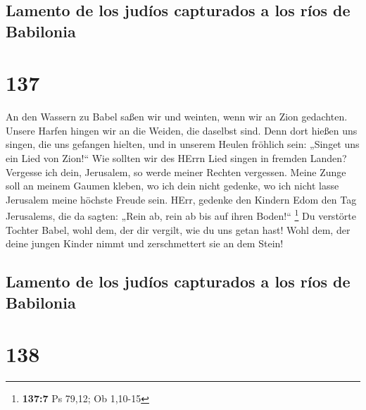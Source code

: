 \hypertarget{lamento-de-los-juduxedos-capturados-a-los-ruxedos-de-babilonia}{%
\subsection{Lamento de los judíos capturados a los ríos de
Babilonia}\label{lamento-de-los-juduxedos-capturados-a-los-ruxedos-de-babilonia}}

\hypertarget{section-136}{%
\section{137}\label{section-136}}

 An den Wassern zu Babel saßen wir und weinten, wenn wir
an Zion gedachten.  Unsere Harfen hingen wir an die
Weiden, die daselbst sind.  Denn dort hießen uns singen,
die uns gefangen hielten, und in unserem Heulen fröhlich sein: „Singet
uns ein Lied von Zion!{}``  Wie sollten wir des HErrn Lied
singen in fremden Landen?  Vergesse ich dein, Jerusalem,
so werde meiner Rechten vergessen.  Meine Zunge soll an
meinem Gaumen kleben, wo ich dein nicht gedenke, wo ich nicht lasse
Jerusalem meine höchste Freude sein.  HErr, gedenke den
Kindern Edom den Tag Jerusalems, die da sagten: „Rein ab, rein ab bis
auf ihren Boden!{}`` \footnote{\textbf{137:7} Ps 79,12; Ob 1,10-15}
 Du verstörte Tochter Babel, wohl dem, der dir vergilt,
wie du uns getan hast!  Wohl dem, der deine jungen Kinder
nimmt und zerschmettert sie an dem Stein!

\hypertarget{lamento-de-los-juduxedos-capturados-a-los-ruxedos-de-babilonia-1}{%
\subsection{Lamento de los judíos capturados a los ríos de
Babilonia}\label{lamento-de-los-juduxedos-capturados-a-los-ruxedos-de-babilonia-1}}

\hypertarget{section-137}{%
\section{138}\label{section-137}}

